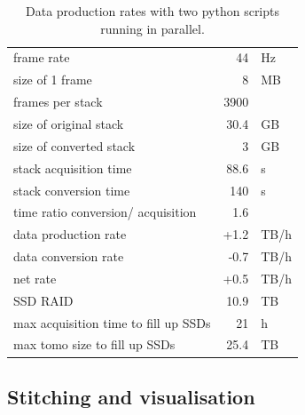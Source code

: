 \documentclass[12pt]{spieman}  %
\begin{document}
\begin{table}%
	\centering
		\caption[Data production]{Data production rates with two python scripts running in parallel.\label{tab:dataproduction}}
		\begin{tabular}{lrl}
		frame rate																	& 44			& Hz	\\
		size of 1 frame															& 8				& MB	\\
		frames per stack														& 3900		& 		\\
		size of original stack											& 30.4		& GB	\\
		size of converted stack											& 3				& GB	\\
		stack acquisition time											& 88.6		& s		\\
		stack conversion time												& 140			& s		\\
		time ratio conversion/ acquisition					& 1.6			& 		\\
		data production rate												& +1.2		&	TB/h\\
		data conversion rate												& -0.7		&	TB/h\\
		net rate																		& +0.5		&	TB/h\\
		SSD RAID																		& 10.9		& TB	\\
		max acquisition time to fill up SSDs				& 21			& h		\\
		max tomo size to fill up SSDs								& 25.4		& TB	\\
		\end{tabular}
\end{table}


	\subsection{Stitching and visualisation}
	
\end{document}
